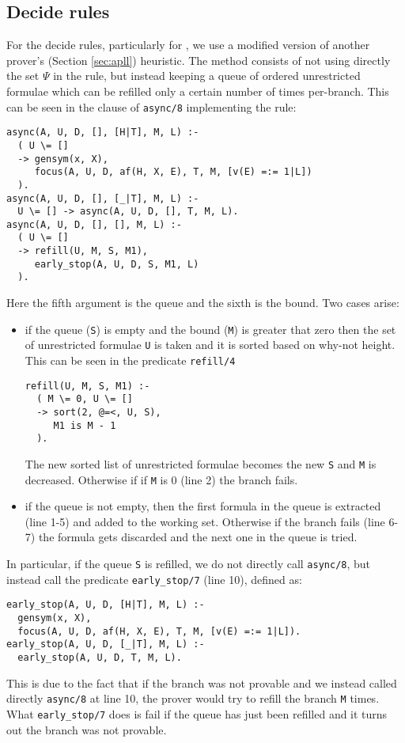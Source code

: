 \subsection{Decide rules}\label{sec:decide}
For the decide rules, particularly for \derRule{\displaydecide[2]}, we use a modified version of another prover's (Section \ref{sec:apll}) heuristic.
The method consists of not using directly the set $\Psi$ in the \derRule{\displaydecide[2]} rule, but instead keeping a queue of ordered unrestricted formulae which can be refilled only a certain number of times per-branch.
This can be seen in the clause of \texttt{async/8} implementing the rule:
\begin{verbatim}
async(A, U, D, [], [H|T], M, L) :-
  ( U \= [] 
  -> gensym(x, X),
     focus(A, U, D, af(H, X, E), T, M, [v(E) =:= 1|L])
  ).
async(A, U, D, [], [_|T], M, L) :-
  U \= [] -> async(A, U, D, [], T, M, L).
async(A, U, D, [], [], M, L) :-
  ( U \= [] 
  -> refill(U, M, S, M1),
     early_stop(A, U, D, S, M1, L) 
  ).
\end{verbatim}
Here the fifth argument is the queue and the sixth is the bound.
Two cases arise:
\begin{itemize}
	\item if the queue (\texttt{S}) is empty and the bound (\texttt{M}) is greater that zero then the set of unrestricted formulae \texttt{U} is taken and it is sorted based on why-not height.	
		This can be seen in the predicate \texttt{refill/4}
		\begin{verbatim}
refill(U, M, S, M1) :-
  ( M \= 0, U \= [] 
  -> sort(2, @=<, U, S), 
     M1 is M - 1
  ).
		\end{verbatim}
		The new sorted list of unrestricted formulae becomes the new \texttt{S} and \texttt{M} is decreased.
		Otherwise if if \texttt{M} is 0 (line 2) the branch fails.
	\item if the queue is not empty, then the first formula in the queue is extracted (line 1-5) and added to the working set.	%
		Otherwise if the branch fails (line 6-7) the formula gets discarded and the next one in the queue is tried.	%
\end{itemize}
In particular, if the queue \texttt{S} is refilled, we do not directly call \texttt{async/8}, but instead call the predicate \texttt{early\_stop/7} (line 10), defined as:
\begin{verbatim}
early_stop(A, U, D, [H|T], M, L) :-
  gensym(x, X),
  focus(A, U, D, af(H, X, E), T, M, [v(E) =:= 1|L]).
early_stop(A, U, D, [_|T], M, L) :-
  early_stop(A, U, D, T, M, L).
\end{verbatim}
This is due to the fact that if the branch was not provable and we instead called directly \texttt{async/8} at line 10, the prover would try to refill the branch \texttt{M} times.
What \texttt{early\_stop/7} does is fail if the queue has just been refilled and it turns out the branch was not provable.

